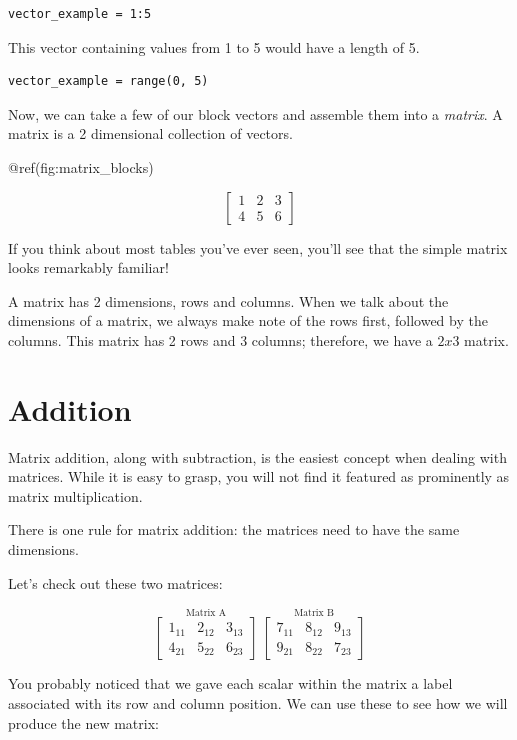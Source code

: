 \documentclass[
  letterpaper,
]{krantz}
\begin{document}
\begin{verbatim}
vector_example = 1:5
\end{verbatim}

This vector containing values from 1 to 5 would have a length of 5.

\begin{verbatim}
vector_example = range(0, 5)
\end{verbatim}

Now, we can take a few of our block vectors and assemble them into a
\emph{matrix}. A matrix is a 2 dimensional collection of vectors.

@ref(fig:matrix\_blocks)

\[
\begin{bmatrix}
1 & 2 & 3\\
4 & 5 & 6
\end{bmatrix}
\]

If you think about most tables you've ever seen, you'll see that the
simple matrix looks remarkably familiar!

A matrix has 2 dimensions, rows and columns. When we talk about the
dimensions of a matrix, we always make note of the rows first, followed
by the columns. This matrix has 2 rows and 3 columns; therefore, we have
a \(2x3\) matrix.

\section{Addition}\label{addition}

Matrix addition, along with subtraction, is the easiest concept when
dealing with matrices. While it is easy to grasp, you will not find it
featured as prominently as matrix multiplication.

There is one rule for matrix addition: the matrices need to have the
same dimensions.

Let's check out these two matrices:

\[
\stackrel{\mbox{Matrix A}}{
\begin{bmatrix}
1_{11} & 2_{12} & 3_{13}\\
4_{21} & 5_{22} & 6_{23}
\end{bmatrix}
}  
\ 
\stackrel{\mbox{Matrix B}}{
\begin{bmatrix}
7_{11} & 8_{12} & 9_{13}\\
9_{21} & 8_{22} & 7_{23}
\end{bmatrix} 
}
\]

You probably noticed that we gave each scalar within the matrix a label
associated with its row and column position. We can use these to see how
we will produce the new matrix:
\end{document}
